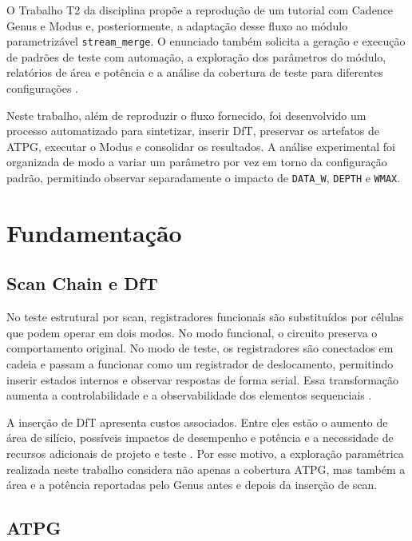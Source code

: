 \documentclass[conference]{IEEEtran}
\begin{document}
O Trabalho T2 da disciplina propõe a reprodução de um tutorial com Cadence Genus e Modus e, posteriormente, a adaptação desse fluxo ao módulo parametrizável \texttt{stream\_merge}. O enunciado também solicita a geração e execução de padrões de teste com automação, a exploração dos parâmetros do módulo, relatórios de área e potência e a análise da cobertura de teste para diferentes configurações \cite{enunciado_t2}.

Neste trabalho, além de reproduzir o fluxo fornecido, foi desenvolvido um processo automatizado para sintetizar, inserir DfT, preservar os artefatos de ATPG, executar o Modus e consolidar os resultados. A análise experimental foi organizada de modo a variar um parâmetro por vez em torno da configuração padrão, permitindo observar separadamente o impacto de \texttt{DATA\_W}, \texttt{DEPTH} e \texttt{WMAX}.

\section{Fundamentação}
\subsection{Scan Chain e DfT}

No teste estrutural por scan, registradores funcionais são substituídos por células que podem operar em dois modos. No modo funcional, o circuito preserva o comportamento original. No modo de teste, os registradores são conectados em cadeia e passam a funcionar como um registrador de deslocamento, permitindo inserir estados internos e observar respostas de forma serial. Essa transformação aumenta a controlabilidade e a observabilidade dos elementos sequenciais \cite{ensilica_dft}.

A inserção de DfT apresenta custos associados. Entre eles estão o aumento de área de silício, possíveis impactos de desempenho e potência e a necessidade de recursos adicionais de projeto e teste \cite{ensilica_dft}. Por esse motivo, a exploração paramétrica realizada neste trabalho considera não apenas a cobertura ATPG, mas também a área e a potência reportadas pelo Genus antes e depois da inserção de scan.

\subsection{ATPG}
\end{document}
